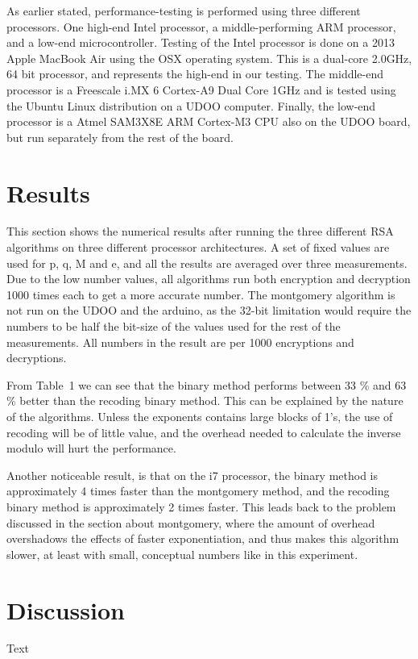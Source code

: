 \documentclass[twocolumn]{IEEEtran}
\begin{document}
As earlier stated, performance-testing is performed using three different processors. One high-end Intel processor, a middle-performing ARM processor, and a low-end microcontroller. Testing of the Intel processor is done on a 2013 Apple MacBook Air using the OSX operating system. This is a dual-core 2.0GHz, 64 bit processor, and represents the high-end in our testing. The middle-end processor is a Freescale i.MX 6 Cortex-A9 Dual Core 1GHz and is tested using the Ubuntu Linux distribution on a UDOO computer. Finally, the low-end processor is a Atmel SAM3X8E ARM Cortex-M3 CPU also on the UDOO board, but run separately from the rest of the board.

\section{Results}
This section shows the numerical results after running the three different RSA algorithms on three different processor architectures. A set of fixed values are used for p, q, M and e, and all the results are averaged over three measurements. Due to the low number values, all algorithms run both encryption and decryption 1000 times each to get a more accurate number. The montgomery algorithm is not run on the UDOO and the arduino, as the 32-bit limitation would require the numbers to be half the bit-size of the values used for the rest of the measurements. All numbers in the result are per 1000 encryptions and decryptions.

From Table~1 we can see that the binary method performs between 33 \% and 63 \% better than the recoding binary method. This can be explained by the nature of the algorithms. Unless the exponents contains large blocks of 1’s, the use of recoding will be of little value, and the overhead needed to calculate the inverse modulo will hurt the performance.

Another noticeable result, is that on the i7 processor, the binary method is approximately 4 times faster than the montgomery method, and the recoding binary method is approximately 2 times faster. This leads back to the problem discussed in the section about montgomery, where the amount of overhead overshadows the effects of faster exponentiation, and thus makes this algorithm slower, at least with small, conceptual numbers like in this experiment.

\section{Discussion}
Text
\end{document}
